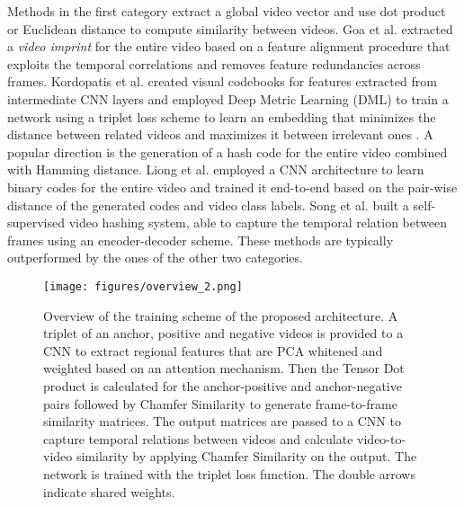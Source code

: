 \documentclass[10pt,twocolumn,letterpaper]{article}
\begin{document}
Methods in the first category extract a global video vector and use dot product or Euclidean distance to compute similarity between videos. 
Goa et al. \cite{gao2017} extracted a \textit{video imprint} for the entire video based on a feature alignment procedure that exploits the temporal correlations and removes feature redundancies across frames. Kordopatis et al. created visual codebooks for features extracted from intermediate CNN layers \cite{kordopatis2017a} and employed Deep Metric Learning (DML) to train a network using a triplet loss scheme to learn an embedding that minimizes the distance between related videos and maximizes it between irrelevant ones \cite{kordopatis2017b}. A popular direction is the generation of a hash code for the entire video combined with Hamming distance. Liong et al. \cite{liong2017} employed a CNN architecture to learn binary codes for the entire video and trained it end-to-end based on the pair-wise distance of the generated codes and video class labels. Song et al. \cite{song2018} built a self-supervised video hashing system, able to capture the temporal relation between frames using an encoder-decoder scheme. These methods are typically outperformed by the ones of the other two categories. 


\begin{figure*}[t]
\centering
\texttt{[image: figures/overview\_2.png]}
\vspace{0.1cm}
\caption{Overview of the training scheme of the proposed architecture. A triplet of an anchor, positive and negative videos is provided to a CNN to extract regional features that are PCA whitened and weighted based on an attention mechanism. Then the Tensor Dot product is calculated for the anchor-positive and anchor-negative pairs followed by Chamfer Similarity to generate frame-to-frame similarity matrices. The output matrices are passed to a CNN to capture temporal relations between videos and calculate video-to-video similarity by applying Chamfer Similarity on the output. The network is trained with the triplet loss function. The double arrows indicate shared weights.} \label{fig:approach_overview}
\end{figure*}
\end{document}
